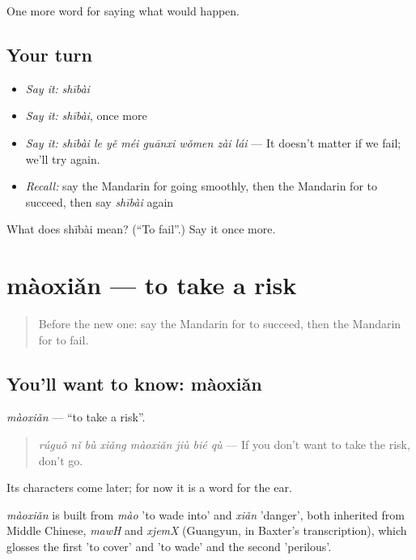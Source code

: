 \begin{grammarlens}[title={What you've built}]
One more word for saying what would happen.
\end{grammarlens}

\subsection*{Your turn}
\begin{itemize}
\raggedright
  \item \emph{Say it:} \emph{shībài}
  \item \emph{Say it:} \emph{shībài}, once more
  \item \emph{Say it:} \emph{shībài le yě méi guānxi wǒmen zài lái} — It doesn't matter if we fail; we'll try again.
  \item \emph{Recall:} say the Mandarin for going smoothly, then the Mandarin for to succeed, then say \emph{shībài} again
\end{itemize}

\begin{tcolorbox}[breakable,colback=teal!4,colframe=teal!35!black,title={Before you move on}]
What does shībài mean? (\textquotedblleft{}To fail\textquotedblright{}.) Say it once more.
\end{tcolorbox}
\section[màoxiǎn]{màoxiǎn — to take a risk}

\label{lesson:ZH-C394-maoxian}



\begin{quote}
Before the new one: say the Mandarin for to succeed, then the Mandarin for to fail.
\end{quote}

\subsection*{You'll want to know: màoxiǎn}
\emph{màoxiǎn} — \textquotedblleft{}to take a risk\textquotedblright{}.

\begin{quote}
\emph{rúguǒ nǐ bù xiǎng màoxiǎn jiù bié qù} — If you don't want to take the risk, don't go.
\end{quote}

Its characters come later; for now it is a word for the ear.

\begin{cousinweb}
\emph{màoxiǎn} is built from \emph{mào} 'to wade into' and \emph{xiǎn} 'danger', both inherited from Middle Chinese, \emph{mawH} and \emph{xjemX} (Guangyun, in Baxter's transcription), which glosses the first 'to cover' and 'to wade' and the second 'perilous'.
\end{cousinweb}

